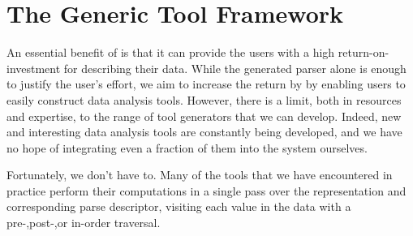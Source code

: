 \section{The Generic Tool Framework}
\label{sec:gen-tool}


An essential benefit of \padsml{} is that it can provide the users
with a high return-on-investment for describing their data. While the
generated parser alone is enough to justify the user's effort, we aim
to increase the return by by enabling users to easily construct data
analysis tools. However, there is a limit, both in resources and
expertise, to the range of tool generators that we can develop.
Indeed, new and interesting data analysis tools are constantly being
developed, and we have no hope of integrating even a fraction of them
into the \padsml{} system ourselves.

Fortunately, we don't have to. Many of the tools that we have
encountered in practice perform their computations in a single pass
over the representation and corresponding parse descriptor, visiting
each value in the data with a pre-,post-,or in-order traversal.


